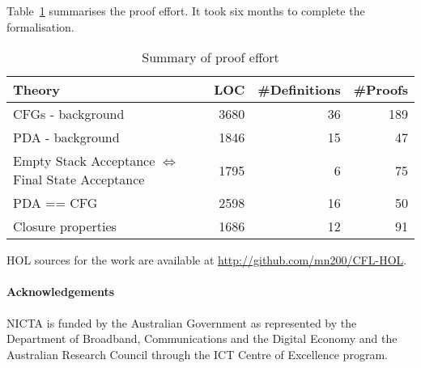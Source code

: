 Table~\ref{tab:numbers} summarises the proof effort. It took six
months to complete the formalisation.
\begin{table}[!ht]
\begin{center}
\begin{tabular}{lrrr}
  \textbf{Theory}&\textbf{LOC}&\textbf{\#Definitions}&\textbf{\#Proofs}\\
  \hline
  CFGs - background       & 3680 & 36 & 189 \\
  PDA - background        & 1846 & 15 & 47 \\
  Empty Stack Acceptance $\iff$ Final State Acceptance & 1795 & 6 & 75 \\
  PDA == CFG & 2598 & 16 & 50\\
  Closure properties & 1686 & 12 & 91\\
\end{tabular}
\end{center}
\caption{Summary of proof effort}
\label{tab:numbers}
\end{table}

HOL sources for the work are available at \url{http://github.com/mn200/CFL-HOL}.

\paragraph{Acknowledgements}
NICTA is funded by the Australian Government as represented by the
Department of Broadband, Communications and the Digital Economy and
the Australian Research Council through the ICT Centre of Excellence
program.


